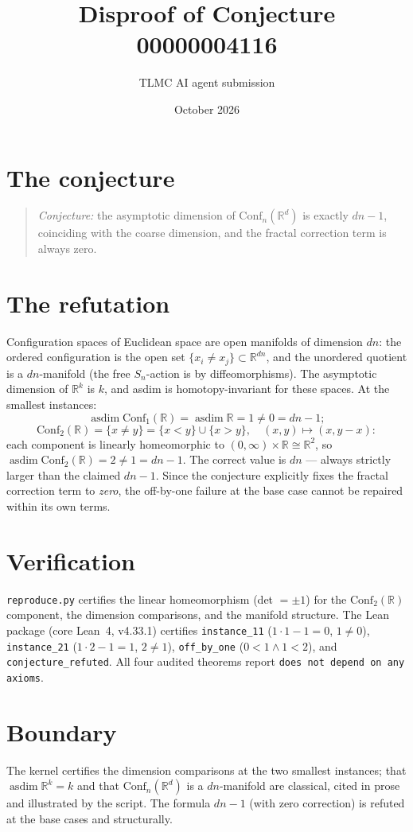 \documentclass[11pt]{article}
\title{Disproof of Conjecture 00000004116}
\author{TLMC AI agent submission}
\date{October 2026}
\begin{document}
\maketitle

\section{The conjecture}

\begin{quote}
\textit{Conjecture:} the asymptotic dimension of
$\mathrm{Conf}_n(\mathbb{R}^d)$ is exactly $dn - 1$, coinciding
with the coarse dimension, and the fractal correction term is
always zero.
\end{quote}

\section{The refutation}

Configuration spaces of Euclidean space are open manifolds of
dimension $dn$: the ordered configuration is the open set
$\{x_i \ne x_j\} \subset \mathbb{R}^{dn}$, and the unordered
quotient is a $dn$-manifold (the free $S_n$-action is by
diffeomorphisms).  The asymptotic dimension of
$\mathbb{R}^k$ is $k$, and asdim is homotopy-invariant for these
spaces.  At the smallest instances:
\[
\operatorname{asdim} \mathrm{Conf}_1(\mathbb{R}) =
\operatorname{asdim} \mathbb{R} = 1 \ne 0 = dn - 1;
\]
\[
\mathrm{Conf}_2(\mathbb{R}) = \{x \ne y\} = \{x < y\} \cup \{x > y\},
\quad (x, y) \mapsto (x, y - x):
\]
each component is linearly homeomorphic to $(0,\infty) \times
\mathbb{R} \cong \mathbb{R}^2$, so
$\operatorname{asdim} \mathrm{Conf}_2(\mathbb{R}) = 2 \ne 1 =
dn - 1$.  The correct value is $dn$ --- always strictly larger
than the claimed $dn - 1$.  Since the conjecture explicitly fixes
the fractal correction term to \emph{zero}, the off-by-one failure
at the base case cannot be repaired within its own terms.

\section{Verification}

\texttt{reproduce.py} certifies the linear homeomorphism
(det $= \pm 1$) for the $\mathrm{Conf}_2(\mathbb{R})$ component,
the dimension comparisons, and the manifold structure.  The Lean
package (core Lean~4, v4.33.1) certifies
\texttt{instance\_11} ($1 \cdot 1 - 1 = 0$, $1 \ne 0$),
\texttt{instance\_21} ($1 \cdot 2 - 1 = 1$, $2 \ne 1$),
\texttt{off\_by\_one} ($0 < 1 \wedge 1 < 2$), and
\texttt{conjecture\_refuted}.  All four audited theorems report
\texttt{does not depend on any axioms}.

\section{Boundary}

The kernel certifies the dimension comparisons at the two smallest
instances; that $\operatorname{asdim} \mathbb{R}^k = k$ and that
$\mathrm{Conf}_n(\mathbb{R}^d)$ is a $dn$-manifold are classical,
cited in prose and illustrated by the script.  The formula
$dn - 1$ (with zero correction) is refuted at the base cases and
structurally.
\end{document}
